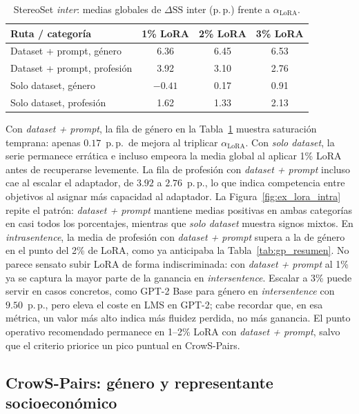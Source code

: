 \documentclass[12pt,a4paper]{report}
\newcommand{\dSS}{\ensuremath{\Delta\mathrm{SS}}}
\newcommand{\aLoRA}{\ensuremath{\alpha_{\mathrm{LoRA}}}}
\begin{document}
\begin{table}[H]
\centering\small
\caption{StereoSet \textit{inter}: medias globales de $\dSS$ inter (p.\,p.) frente a \aLoRA{}.}
\label{tab:ex_lora_inter}
\begin{tabular}{@{}lccc@{}}
\toprule
\textbf{Ruta / categoría} & \textbf{1\% LoRA} & \textbf{2\% LoRA} & \textbf{3\% LoRA} \\
\midrule
Dataset + prompt, género & 6.36 & 6.45 & 6.53 \\
Dataset + prompt, profesión & 3.92 & 3.10 & 2.76 \\
Solo dataset, género & $-0.41$ & 0.17 & 0.91 \\
Solo dataset, profesión & 1.62 & 1.33 & 2.13 \\
\bottomrule
\end{tabular}
\end{table}

Con \textit{dataset + prompt}, la fila de género en la Tabla~\ref{tab:ex_lora_inter} muestra saturación temprana: apenas $0.17$~p.\,p.\ de mejora al triplicar \aLoRA{}. Con \textit{solo dataset}, la serie permanece errática e incluso empeora la media global al aplicar 1\% LoRA antes de recuperarse levemente. La fila de profesión con \textit{dataset + prompt} incluso cae al escalar el adaptador, de $3.92$ a $2.76$~p.\,p., lo que indica competencia entre objetivos al asignar más capacidad al adaptador. La Figura~\ref{fig:ex_lora_intra} repite el patrón: \textit{dataset + prompt} mantiene medias positivas en ambas categorías en casi todos los porcentajes, mientras que \textit{solo dataset} muestra signos mixtos. En \textit{intrasentence}, la media de profesión con \textit{dataset + prompt} supera a la de género en el punto del 2\% de LoRA, como ya anticipaba la Tabla~\ref{tab:gp_resumen}. No parece sensato subir LoRA de forma indiscriminada: con \textit{dataset + prompt} al 1\% ya se captura la mayor parte de la ganancia en \textit{intersentence}. Escalar a 3\% puede servir en casos concretos, como GPT-2 Base para género en \textit{intersentence} con $9.50$~p.\,p., pero eleva el coste en LMS en GPT-2; cabe recordar que, en esa métrica, un valor más alto indica más fluidez perdida, no más ganancia. El punto operativo recomendado permanece en 1--2\% LoRA con \textit{dataset + prompt}, salvo que el criterio priorice un pico puntual en CrowS-Pairs.

\FloatBarrier
\subsection{CrowS-Pairs: género y representante socioeconómico}
\label{subsec:ex_crowspairs}
\end{document}
